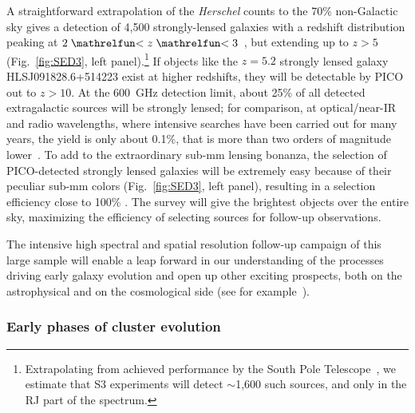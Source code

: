 \documentclass[PICOReport.tex]{subfiles}
\begin{document}
A straightforward extrapolation of the \textit{Herschel} counts to the 70\% non-Galactic sky gives a detection of 4,500 strongly-lensed galaxies with a redshift distribution peaking at $2\simlt z \simlt 3$~\cite{Negrello2017lensed}, but extending up to $z> 5$ (Fig.~\ref{fig:SED3}, left panel).\footnote{Extrapolating from achieved performance by the South Pole Telescope~\cite{??}, we estimate that S3 experiments will detect $\sim$1,600 such sources, and only in the RJ part of the spectrum.} If objects like the $z=5.2$ strongly lensed galaxy HLSJ091828.6+514223 exist at higher redshifts, they will be detectable by PICO out to $z>10$. At the 600~GHz detection limit, about 25\% of all detected extragalactic sources will be strongly lensed; for comparison, at optical/near-IR and radio wavelengths, where intensive searches have been carried out for many years, the yield is only about 0.1\%, that is more than two orders of magnitude lower~\cite{Treu2010}. To add to the extraordinary sub-mm lensing bonanza, the selection of PICO-detected strongly lensed galaxies will be extremely easy because of their peculiar sub-mm colors (Fig.~\ref{fig:SED3}, left panel), resulting in a selection efficiency close to 100\% \citep{Negrello2010}. The survey will give the brightest objects over the entire sky, maximizing the efficiency of selecting sources for follow-up observations. 

The intensive high spectral and spatial resolution follow-up campaign of this large sample will enable a leap forward in our understanding of the processes driving early galaxy evolution and open up other exciting prospects, both on the astrophysical and on the cosmological side (see for example~\citet{Treu2010}).

\subsubsection{Early phases of cluster evolution}
\end{document}
